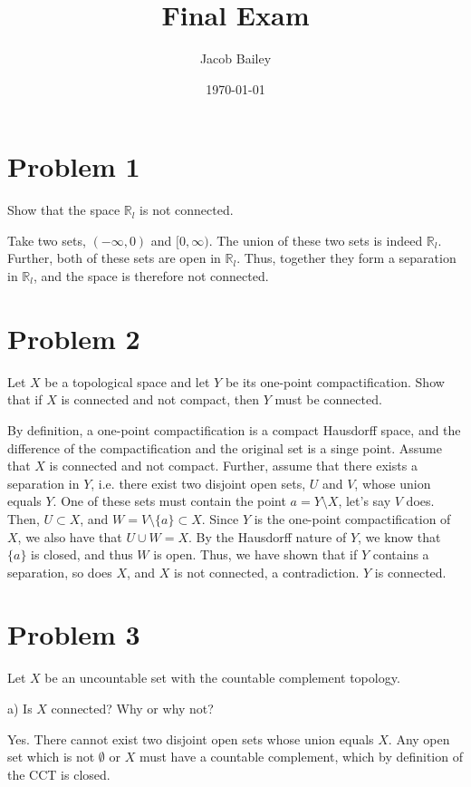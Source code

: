 \documentclass[11pt]{article}
\author{Jacob Bailey}
\date{\today}
\title{Final Exam}
\begin{document}
\maketitle
\section{Problem 1}
\label{sec:org1db0e48}

Show that the space \(\mathbb{R}_l\) is not connected. 

Take two sets, \((-\infty, 0)\) and \([0, \infty)\). The union of these two sets is
indeed \(\mathbb{R}_l\). Further, both of these sets are open in \(\mathbb{R}_l\).
Thus, together they form a separation in \(\mathbb{R}_l\), and the space is
therefore not connected. 

\section{Problem 2}
\label{sec:org382666b}

Let \(X\) be a topological space and let \(Y\) be its one-point compactification.
Show that if \(X\) is connected and not compact, then \(Y\) must be connected. 

By definition, a one-point compactification is a compact Hausdorff space, and
the difference of the compactification and the original set is a singe point.
Assume that \(X\) is connected and not compact. Further, assume that there exists
a separation in \(Y\), i.e. there exist two disjoint open sets, \(U\) and \(V\), whose
union equals \(Y\). One of these sets must contain the point \(a = Y\setminus X\),
let's say \(V\) does. Then, \(U\subset X\), and \(W = V\setminus\{a\} \subset X\).
Since \(Y\) is the one-point compactification of \(X\), we also have that \(U\cup W =
X\). By the Hausdorff nature of \(Y\), we know that \(\{a\}\) is closed, and thus \(W\) is
open. Thus, we have shown that if \(Y\) contains a separation, so does \(X\), and
\(X\) is not connected, a contradiction. \(Y\) is connected.  

\section{Problem 3}
\label{sec:org0f01fd7}

Let \(X\) be an uncountable set with the countable complement topology. 

a) Is \(X\) connected? Why or why not?

Yes. There cannot exist two disjoint open sets whose union equals \(X\). Any open
set which is not \(\emptyset\) or \(X\) must have a countable complement, which by
definition of the CCT is closed.  
\end{document}
